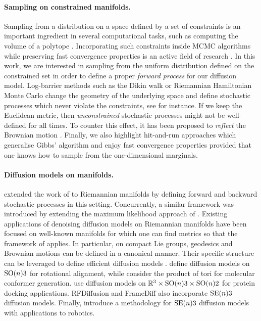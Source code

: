 \paragraph{Sampling on constrained manifolds.}
Sampling from a distribution on a space defined by a set of constraints is an important ingredient in several computational tasks, such as computing the volume of a polytope \parencite{lee2017Geodesic}.
Incorporating such constraints inside MCMC algorithms while preserving fast convergence properties is an active field of research \parencite{kook2022sampling,lee2017Geodesic,noble2022Barrier}.
In this work, we are interested in sampling from the uniform distribution defined on the constrained set in order to define a proper \emph{forward process} for our diffusion model.
Log-barrier methods such as the Dikin walk or Riemannian Hamiltonian Monte Carlo \cite{Kannan2009,lee2017Geodesic,noble2022Barrier} change the geometry of the underlying space and define stochastic processes which never violate the constraints, see \cite{Kannan2009,noble2022Barrier} for instance.
If we keep the Euclidean metric, then \emph{unconstrained} stochastic processes might not be well-defined for all times.
To counter this effect, it has been proposed to \emph{reflect} the Brownian motion \cite{williams1987Reflected,petit1997Time,shkolnikov2013Timereversal}.
Finally, we also highlight hit-and-run approaches \parencite{Smith1984,Lovasz2006} which generalise Gibbs' algorithm and enjoy fast convergence properties provided that one knows how to sample from the one-dimensional marginals.

\paragraph{Diffusion models on manifolds.}
\textcite{de2022riemannian} extended the work of \textcite{song2020score} to
Riemannian manifolds by defining forward and backward stochastic processes in
this setting.
Concurrently, a similar framework was introduced by \textcite{huang2022riemannian} extending the maximum likelihood approach of \textcite{huang2021variational}.
Existing applications of denoising diffusion models on Riemannian manifolds have been focused on well-known manifolds for which one can find metrics so that the framework of \textcite{de2022riemannian} applies.
In particular, on compact Lie groups, geodesics and Brownian motions can be defined in a canonical manner.
Their specific structure can be leveraged to define efficient diffusion models \cite{yim2023se}.
\textcite{leach2022denoising} define diffusion models on
$\mathrm{SO}(n){3}$ for rotational alignment, while \textcite{jing2022torsional}
consider the product of tori for molecular conformer
generation. \textcite{corso2023diffdock} use diffusion models on
$\mathbb{R}^3 \times \mathrm{SO}(n){3} \times \mathrm{SO}(n){2}$ for protein docking
applications.
RFDiffusion \parencite{watson2022Broadly} and FrameDiff also incorporate $\mathrm{SE}(n){3}$ diffusion models.
Finally, \textcite{urain2022se} introduce a methodology for $\mathrm{SE}(n){3}$ diffusion models with applications to robotics.

